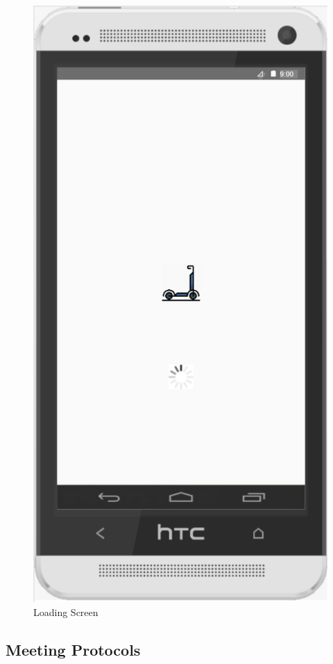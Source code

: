\documentclass[a4paper, 12pt]{article}
\begin{document}
\begin{figure} [htbp]
  \begin{center}
    \includegraphics[scale=0.75]{images/prototypes/06-loading-screen.png}
  \end{center}
  \caption{Loading Screen}
\end{figure}

\newpage
\subsection{Meeting Protocols}
\end{document}
